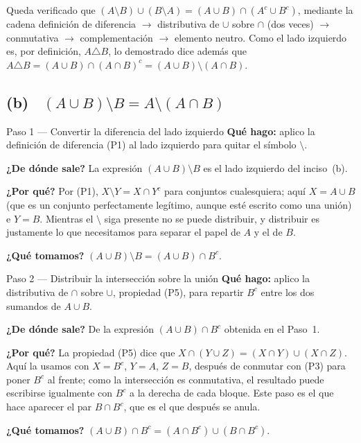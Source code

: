 \documentclass[11pt]{article}
\begin{document}
\begin{resp}
Queda verificado que $(A\setminus B)\cup(B\setminus A)=(A\cup B)\cap(A^{c}\cup B^{c})$, mediante
la cadena definición de diferencia $\to$ distributiva de $\cup$ sobre $\cap$ (dos veces) $\to$
conmutativa $\to$ complementación $\to$ elemento neutro. Como el lado izquierdo es, por
definición, $A\triangle B$, lo demostrado dice además que
$A\triangle B=(A\cup B)\cap(A\cap B)^{c}=(A\cup B)\setminus(A\cap B)$.
\end{resp}

\subsection*{(b) \ $(A\cup B)\setminus B=A\setminus(A\cap B)$}

\begin{paso}{Paso 1 --- Convertir la diferencia del lado izquierdo}
\textbf{Qué hago:} aplico la definición de diferencia (P1) al lado izquierdo para quitar el
símbolo $\setminus$.

\textbf{¿De dónde sale?} La expresión $(A\cup B)\setminus B$ es el lado izquierdo del inciso~(b).

\textbf{¿Por qué?} Por (P1), $X\setminus Y=X\cap Y^{c}$ para conjuntos cualesquiera; aquí
$X=A\cup B$ (que es un conjunto perfectamente legítimo, aunque esté escrito como una unión) e
$Y=B$. Mientras el $\setminus$ siga presente no se puede distribuir, y distribuir es
justamente lo que necesitamos para separar el papel de $A$ y el de $B$.

\textbf{¿Qué tomamos?} $(A\cup B)\setminus B=(A\cup B)\cap B^{c}$.
\end{paso}

\begin{paso}{Paso 2 --- Distribuir la intersección sobre la unión}
\textbf{Qué hago:} aplico la distributiva de $\cap$ sobre $\cup$, propiedad (P5), para repartir
$B^{c}$ entre los dos sumandos de $A\cup B$.

\textbf{¿De dónde sale?} De la expresión $(A\cup B)\cap B^{c}$ obtenida en el Paso~1.

\textbf{¿Por qué?} La propiedad (P5) dice que $X\cap(Y\cup Z)=(X\cap Y)\cup(X\cap Z)$. Aquí la
usamos con $X=B^{c}$, $Y=A$, $Z=B$, después de conmutar con (P3) para poner $B^{c}$ al frente;
como la intersección es conmutativa, el resultado puede escribirse igualmente con $B^{c}$ a la
derecha de cada bloque. Este paso es el que hace aparecer el par $B\cap B^{c}$, que es el que
después se anula.

\textbf{¿Qué tomamos?} $(A\cup B)\cap B^{c}=(A\cap B^{c})\cup(B\cap B^{c})$.
\end{paso}
\end{document}
